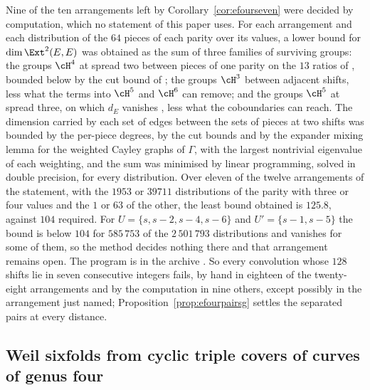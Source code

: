 \begin{remark}\label{rem:efourseven}
Nine of the ten arrangements left by Corollary~\ref{cor:efourseven} were decided by computation, which no statement of this paper uses. For each arrangement and each distribution of the $64$ pieces of each parity over its values, a lower bound for $\dim\Ext^{2}(E,E)$ was obtained as the sum of three families of surviving groups: the groups $\cH^{4}$ at spread two between pieces of one parity on the $13$ ratios of \cite[Lemma~18.39(ii)]{BMB26}, bounded below by the cut bound of \cite[Lemma~18.40]{BMB26}; the groups $\cH^{3}$ between adjacent shifts, less what the terms into $\cH^{5}$ and $\cH^{6}$ can remove; and the groups $\cH^{5}$ at spread three, on which $d_{E}$ vanishes \cite[Lemma~18.39(iii)]{BMB26}, less what the coboundaries can reach. The dimension carried by each set of edges between the sets of pieces at two shifts was bounded by the per-piece degrees, by the cut bounds and by the expander mixing lemma for the weighted Cayley graphs of $\Gamma$, with the largest nontrivial eigenvalue of each weighting, and the sum was minimised by linear programming, solved in double precision, for every distribution. Over eleven of the twelve arrangements of the statement, with the $1953$ or $39711$ distributions of the parity with three or four values and the $1$ or $63$ of the other, the least bound obtained is $125.8$, against $104$ required. For $U=\{s,s-2,s-4,s-6\}$ and $U'=\{s-1,s-5\}$ the bound is below $104$ for $585\,753$ of the $2\,501\,793$ distributions and vanishes for some of them, so the method decides nothing there and that arrangement remains open. The program is in the archive \cite{BB26code}. So every convolution whose $128$ shifts lie in seven consecutive integers fails, by hand in eighteen of the twenty-eight arrangements and by the computation in nine others, except possibly in the arrangement just named; Proposition~\ref{prop:efourpairsg} settles the separated pairs at every distance.
\end{remark}

\subsection{Weil sixfolds from cyclic triple covers of curves of genus four}\label{ssec:genusfour}

